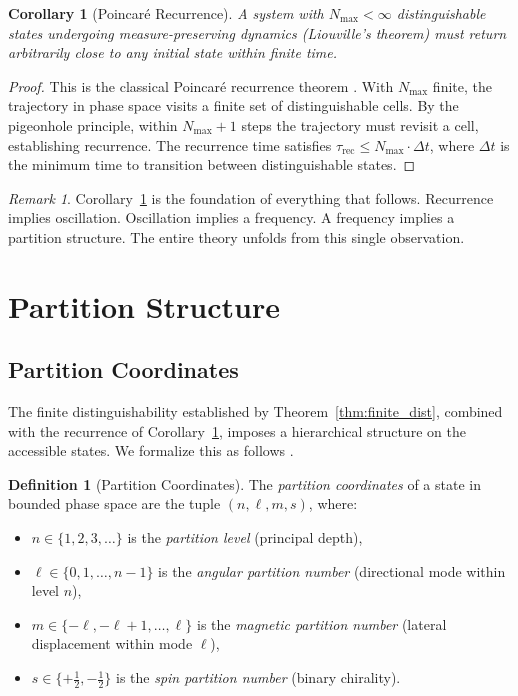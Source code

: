 \documentclass[11pt,twocolumn,a4paper]{article}
\theoremstyle{plain}
\newtheorem{corollary}[theorem]{Corollary}
\theoremstyle{definition}
\newtheorem{definition}[theorem]{Definition}
\theoremstyle{remark}
\newtheorem{remark}[theorem]{Remark}
\newcommand{\Nmax}{N_{\mathrm{max}}}
\begin{document}
\begin{corollary}[Poincar\'e Recurrence]
\label{cor:poincare}
A system with $\Nmax < \infty$ distinguishable states undergoing measure-preserving dynamics (Liouville's theorem) must return arbitrarily close to any initial state within finite time.
\end{corollary}

\begin{proof}
This is the classical Poincar\'e recurrence theorem \cite{poincare1890probleme, arnold1978mathematical, katok1995introduction}. With $\Nmax$ finite, the trajectory in phase space visits a finite set of distinguishable cells. By the pigeonhole principle, within $\Nmax + 1$ steps the trajectory must revisit a cell, establishing recurrence. The recurrence time satisfies $\tau_{\mathrm{rec}} \leq \Nmax \cdot \Delta t$, where $\Delta t$ is the minimum time to transition between distinguishable states.
\end{proof}

\begin{remark}
Corollary~\ref{cor:poincare} is the foundation of everything that follows. Recurrence implies oscillation. Oscillation implies a frequency. A frequency implies a partition structure. The entire theory unfolds from this single observation.
\end{remark}


\section{Partition Structure}
\label{sec:partition}

\subsection{Partition Coordinates}

The finite distinguishability established by Theorem~\ref{thm:finite_dist}, combined with the recurrence of Corollary~\ref{cor:poincare}, imposes a hierarchical structure on the accessible states. We formalize this as follows \cite{sachikonye2026partition, sachikonye2026counting}.

\begin{definition}[Partition Coordinates]
\label{def:partition_coords}
The \emph{partition coordinates} of a state in bounded phase space are the tuple $(n, \ell, m, s)$, where:
\begin{itemize}[nosep]
    \item $n \in \{1, 2, 3, \ldots\}$ is the \emph{partition level} (principal depth),
    \item $\ell \in \{0, 1, \ldots, n-1\}$ is the \emph{angular partition number} (directional mode within level $n$),
    \item $m \in \{-\ell, -\ell+1, \ldots, \ell\}$ is the \emph{magnetic partition number} (lateral displacement within mode $\ell$),
    \item $s \in \{+\tfrac{1}{2}, -\tfrac{1}{2}\}$ is the \emph{spin partition number} (binary chirality).
\end{itemize}
\end{definition}
\end{document}
